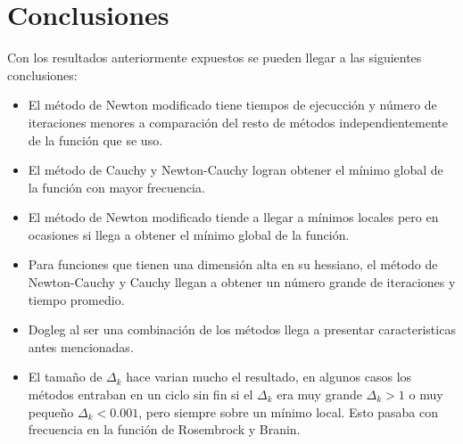 \section{Conclusiones}

Con los resultados anteriormente expuestos se pueden llegar a las siguientes conclusiones:

\begin{itemize}
    \item El método de Newton modificado tiene tiempos de ejecucción y número de iteraciones menores a comparación del resto de métodos independientemente de la función que se uso.
    \item El método de Cauchy y Newton-Cauchy logran obtener el mínimo global de la función con mayor frecuencia.
    \item El método de Newton modificado tiende a llegar a mínimos locales pero en ocasiones si llega a obtener el mínimo global de la función.
    \item Para funciones que tienen una dimensión alta en su hessiano, el método de Newton-Cauchy y Cauchy llegan a obtener un número grande de iteraciones y tiempo promedio.
    \item Dogleg al ser una combinación de los métodos llega a presentar caracteristicas antes mencionadas.
    \item El tamaño de $\Delta_k$ hace varian mucho el resultado, en algunos casos los métodos entraban en un ciclo sin fin si el $\Delta_k$ era muy grande $\Delta_k>1$ o muy pequeño $\Delta_k < 0.001$, pero siempre sobre un mínimo local. Esto pasaba con frecuencia en la función de Rosembrock y Branin.
\end{itemize}